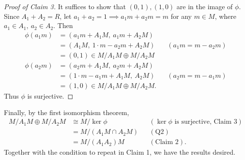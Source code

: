 \documentclass{article}
\theoremstyle{plain}
\begin{document}
\begin{proof}[Proof of Claim 3]
  It suffices to show that $(0,1),(1,0)$ are in the image of $\phi$. Since
  $A_{1}+A_{2}=R$, let $a_{1}+a_{2}=1\implies a_{1}m+a_{2}m=m$ for any $m\in M$,
  where $a_{1}\in A_{1},\ a_{2}\in A_{2}$. Then
  \begin{align*}
    \phi(a_{1}m)&=(a_{1}m+A_{1}M,\ a_{1}m+A_{2}M)\\
    &=(A_{1}M,\ 1\cdot m - a_{2}m+A_{2}M)&&(a_{1}m=m-a_{2}m)\\
    &=(0,1)\in M/A_{1}M \oplus M/A_{2}M\\
    \phi(a_{2}m)&=(a_{2}m+A_{1}M,\ a_{2}m+A_{2}M)\\
    &=(1\cdot m-a_{1}m + A_{1}M,\ A_{2}M)&&(a_{2}m=m-a_{1}m)\\
    &=(1,0)\in M/A_{1}M \oplus M/A_{2}M.
  \end{align*}
  Thus $\phi$ is surjective.
\end{proof}
Finally, by the first isomorphism theorem,
\begin{align*}
  M/A_{1}M\oplus M/A_{2}M &\cong M/\ker\phi&&(\ker\phi\text{ is surjective, Claim 3})\\
  &= M/(A_{1}M\cap A_{2}M)&&(\text{Q2})\\
  &= M/(A_{1}A_{2})M &&(\text{Claim 2}).
\end{align*}
Together with the condition to repeat in Claim 1, we have the results desired.
\end{document}
